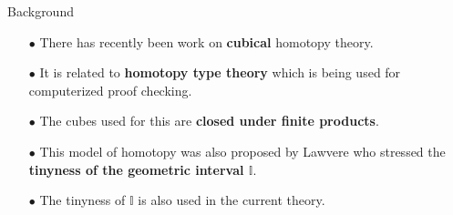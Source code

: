 \documentclass[handout]{beamer}
\newcommand{\myemph}[1]{\textbf{#1}}    %
\theoremstyle{remark}
\begin{document}
%
%
%
%
\begin{frame}{Background}

\begin{itemize}
\item[$\bullet$] There has recently been work on \myemph{cubical} homotopy theory. 
\item[$\bullet$] It is related to \myemph{homotopy type theory} which is being used for computerized proof checking.
\item[$\bullet$]  The cubes used for this are \myemph{closed under finite products}.  
\item[$\bullet$] This model of homotopy was also proposed by Lawvere who stressed the \myemph{tinyness of the geometric interval $\mathbb{I}$}.
\item[$\bullet$] The tinyness of $\mathbb{I}$ is also used in the current theory.
\end{itemize}

\end{frame}
\end{document}
